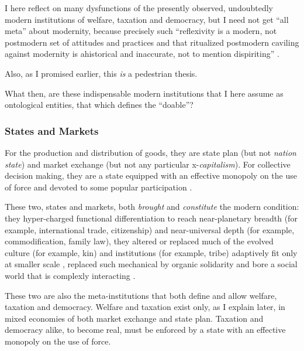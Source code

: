 \begin{enumerate}
	I here reflect on many dysfunctions of the presently observed, undoubtedly modern institutions of welfare, taxation and democracy, but I need not get ``all meta'' about modernity, because precisely such ``reflexivity is a modern, not postmodern set of attitudes and practices and that ritualized postmodern caviling against modernity is ahistorical and inaccurate, not to mention dispiriting'' \citep[1119]{Sica-1997-aa}.

	Also, as I promised earlier, this \emph{is} a pedestrian thesis.
\end{enumerate}

What then, are these indispensable modern institutions that I here assume as ontological entities, that which defines the ``doable''?

\subsubsection{States and Markets}
For the production and distribution of goods, they are state plan (but not \emph{nation state}) and market exchange (but not any particular x-\emph{capitalism}).
For collective decision making, they are a state equipped with an effective monopoly on the use of force and devoted to some popular participation \citep[compare][96]{Giddens1998}.

These two, states and markets, both \emph{brought} and \emph{constitute} the modern condition: they hyper-charged functional differentiation \citep{Smith-1776-lq} to reach near-planetary breadth (for example, international trade, citizenship) and near-universal depth (for example, commodification, family law), they altered or replaced much of the evolved culture (for example, kin) and institutions (for example, tribe) adaptively fit only at smaller scale \citep{Diamond1997}, replaced such mechanical by organic solidarity \citep{Durkheim-1893-aa} and bore a social world that is complexly interacting \citep[for example,][]{Merton-1968-aa,Merton-1936-aa}.

These two are also the meta-institutions that both define and allow welfare, taxation and democracy.
Welfare and taxation exist only, as I explain later, in mixed economies of both market exchange and state plan.
Taxation and democracy alike, to become real, must be enforced by a state with an effective monopoly on the use of force.%

